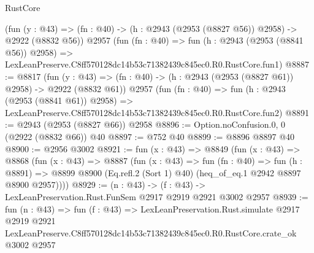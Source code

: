 \begin{lexlean}{RustCore}
\begin{coremodule}
    (fun (y : @43) => (fn : @40) -> (h : @2943 (@2953 (@8827 @56)) @2958) -> @2922 (@8832 @56))
    @2957
    (fun (fn : @40) =>
    fun (h : @2943 (@2953 (@8841 @56)) @2958) =>
    LexLeanPreserve.C8ff570128dc14b53c71382439c845ec0.R0.RustCore.fun1)
@8887 := @8817
    (fun (y : @43) => (fn : @40) -> (h : @2943 (@2953 (@8827 @61)) @2958) -> @2922 (@8832 @61))
    @2957
    (fun (fn : @40) =>
    fun (h : @2943 (@2953 (@8841 @61)) @2958) =>
    LexLeanPreserve.C8ff570128dc14b53c71382439c845ec0.R0.RustCore.fun2)
@8891 := @2943 (@2953 (@8827 @66)) @2958
@8896 := Option.noConfusion.{0, 0} (@2922 (@8832 @66)) @40
@8897 := @752 @40
@8899 := @8896 @8897 @40
@8900 := @2956 @3002
@8921 := fun (x : @43) =>
  @8849
    (fun (x : @43) =>
    @8868
      (fun (x : @43) =>
      @8887
        (fun (x : @43) =>
        fun (fn : @40) =>
        fun (h : @8891) =>
        @8899 @8900 (Eq.refl.{2} (Sort 1) @40) (heq_of_eq.{1} @2942 @8897 @8900 @2957))))
@8929 := (n : @43) -> (f : @43) -> LexLeanPreservation.Rust.FunSem @2917 @2919 @2921 @3002 @2957
@8939 := fun (n : @43) =>
  fun (f : @43) =>
  LexLeanPreservation.Rust.simulate
    @2917
    @2919
    @2921
    LexLeanPreserve.C8ff570128dc14b53c71382439c845ec0.R0.RustCore.crate_ok
    @3002
    @2957
\end{coremodule}
\end{lexlean}
